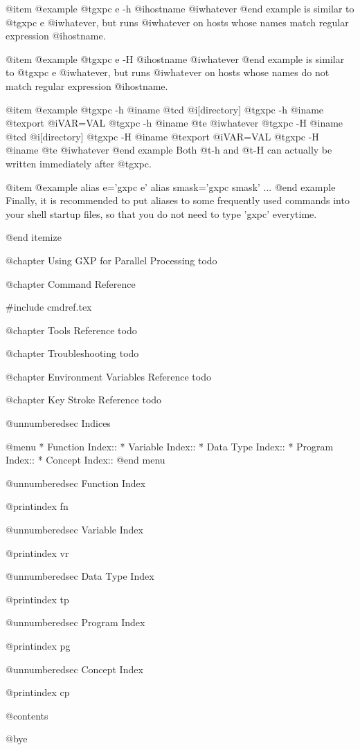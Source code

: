 @item 
@example
@t{gxpc e} -h @i{hostname} @i{whatever}
@end example
is similar to @t{gxpc e} @i{whatever}, but runs @i{whatever} on
hosts whose names match regular expression @i{hostname}. 

@item 
@example
@t{gxpc e} -H @i{hostname} @i{whatever}
@end example
is similar to @t{gxpc e} @i{whatever}, but runs @i{whatever} on
hosts whose names do not match regular expression @i{hostname}. 

@item 
@example
@t{gxpc -h} @i{name} @t{cd} @i{[directory]}
@t{gxpc -h} @i{name} @t{export} @i{VAR=VAL}
@t{gxpc -h} @i{name} @t{e} @i{whatever}
@t{gxpc -H} @i{name} @t{cd} @i{[directory]}
@t{gxpc -H} @i{name} @t{export} @i{VAR=VAL}
@t{gxpc -H} @i{name} @t{e} @i{whatever}
@end example
Both @t{-h} and @t{-H} can actually be written immediately after @t{gxpc}.

@item
@example
alias e='gxpc e'
alias smask='gxpc smask'
...
@end example
Finally, it is recommended to put aliases to some frequently used
commands into your shell startup files, so that you do not need to
type 'gxpc' everytime.


@end itemize




@chapter Using GXP for Parallel Processing
todo

@chapter Command Reference

#include cmdref.tex

@chapter Tools Reference
todo

@chapter Troubleshooting
todo

@chapter Environment Variables Reference
todo

@chapter Key Stroke Reference
todo

@unnumberedsec Indices

@menu
* Function Index::              
* Variable Index::              
* Data Type Index::             
* Program Index::               
* Concept Index::               
@end menu

@unnumberedsec Function Index

@printindex fn

@unnumberedsec Variable Index

@printindex vr

@unnumberedsec Data Type Index

@printindex tp

@unnumberedsec Program Index

@printindex pg

@unnumberedsec Concept Index

@printindex cp


@contents

@bye
                                   

